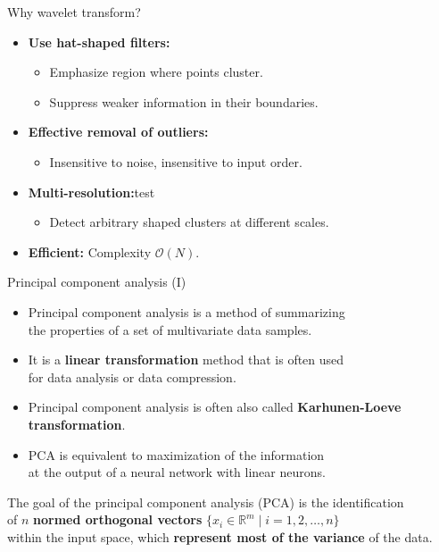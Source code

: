 \documentclass[aspectratio=169,t]{beamer}
\begin{document}
  {
    \begin{frame}{Why wavelet transform?}
    \begin{itemize}
      \item \textbf{Use hat-shaped filters:}
      \begin{itemize}
        \item Emphasize region where points cluster.
        \item Suppress weaker information in their boundaries.
      \end{itemize}
      \item \textbf{Effective removal of outliers:}
      \begin{itemize}
        \item Insensitive to noise, insensitive to input order.
      \end{itemize}
      \item \textbf{Multi-resolution:}test
      \begin{itemize}
        \item Detect arbitrary shaped clusters at different scales.
      \end{itemize}
      \item \textbf{Efficient:} Complexity $\mathcal{O}(N)$.
    \end{itemize}
    \end{frame}
  }

  {
    \begin{frame}{Principal component analysis (I)}
    \begin{itemize}
      \item Principal component analysis is a method of summarizing \\
      the properties of a set of multivariate data samples.
      \item It is a \textbf{linear transformation} method that is often used \\ for data analysis or data compression.
      \item Principal component analysis is often also called \textbf{Karhunen-Loeve transformation}.
      \item PCA is equivalent to maximization of the information \\ at the output of a neural network with linear neurons.
    \end{itemize}
    \vspace{0.5cm}
    The goal of the principal component analysis (PCA) is the identification \\
    of $n$ \textbf{normed orthogonal vectors} $\{x_i \in \mathbb{R}^m \; \vert \; i = 1,2, \ldots,n \}$ \\
    within the input space, which \textbf{represent most of the variance} of the data.
    \end{frame}
  }
\end{document}
